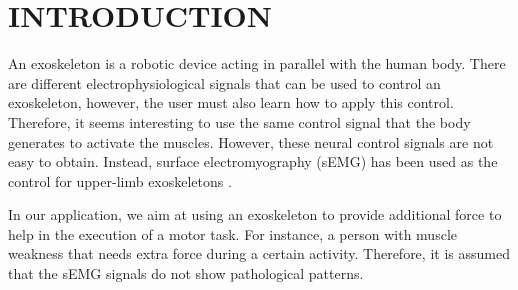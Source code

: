 \documentclass[letterpaper, 10 pt, conference]{ieeeconf}  %
\begin{document}
\begin{abstract}



\end{abstract}


\section{INTRODUCTION}
An exoskeleton is a robotic device acting in parallel with the human body. There are different electrophysiological signals that can be used to control an exoskeleton, however, the user must also learn how to apply this control. Therefore, it seems interesting to use the same 
control signal that the body generates to activate the muscles. However, these neural control signals are not easy to obtain. Instead, surface electromyography (sEMG) has been used  as the control for upper-limb exoskeletons \cite{Tang7332977,Lenzi2012}.

In our application, we aim at using an exoskeleton to provide additional force to help in the execution of a motor task. For instance, a person with muscle weakness that needs extra force during a certain activity. Therefore, it is assumed that the sEMG signals do not show pathological patterns.
\end{document}
